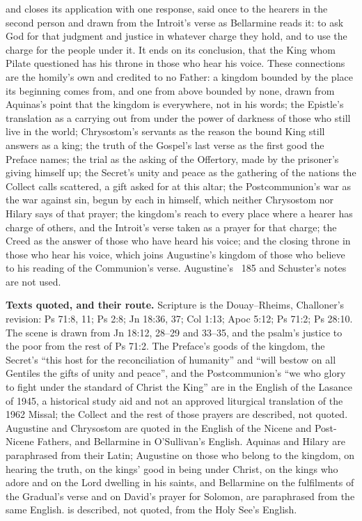 {and closes its application with one response, said once to the hearers in the
second person and drawn from the Introit's verse as Bellarmine reads it: to
ask God for that judgment and justice in whatever charge they hold, and to
use the charge for the people under it. It ends on its conclusion, that the
King whom Pilate questioned has his throne in those who hear his voice.
These connections are the homily's own and credited to no Father: a kingdom
bounded by the place its beginning comes from, and one from above bounded by
none, drawn from Aquinas's point that the kingdom is everywhere, not in his words; the
Epistle's translation as a carrying out from under the power of darkness of
those who still live in the world; Chrysostom's servants as the reason the
bound King still answers as a king; the truth of the Gospel's last verse as
the first good the Preface names; the trial as the asking of the Offertory,
made by the prisoner's giving himself up; the Secret's unity and peace as the
gathering of the nations the Collect calls scattered, a gift asked for at
this altar; the Postcommunion's war as the war against sin, begun by each in
himself, which neither Chrysostom nor Hilary says of that prayer; the
kingdom's reach to every place where a hearer has charge of others, and the
Introit's verse taken as a prayer for that charge; the Creed as the answer of
those who have heard his voice; and the closing throne in those who hear his
voice, which joins Augustine's kingdom of those who believe to his reading of
the Communion's verse. Augustine's ~185 and Schuster's notes are
not used.

\textbf{Texts quoted, and their route.} Scripture is the Douay--Rheims,
Challoner's revision: Ps 71:8, 11; Ps 2:8; Jn 18:36, 37; Col 1:13; Apoc 5:12;
Ps 71:2; Ps 28:10. The scene is drawn from Jn 18:12, 28--29 and 33--35, and
the psalm's justice to the poor from the rest of Ps 71:2. The Preface's goods
of the kingdom, the Secret's ``this host for the reconciliation of humanity''
and ``will bestow on all Gentiles the gifts of unity and peace'', and the
Postcommunion's ``we who glory to fight under the standard of Christ the
King'' are in the English of the Lasance  of 1945, a
historical study aid and not an approved liturgical translation of the 1962
Missal; the Collect and the rest of those prayers are described, not quoted.
Augustine and Chrysostom are quoted in the English of the Nicene and
Post-Nicene Fathers, and Bellarmine in O'Sullivan's English. Aquinas and
Hilary are paraphrased from their Latin; Augustine on those who belong to the
kingdom, on hearing the truth, on the kings' good in being under Christ, on
the kings who adore and on the Lord dwelling in his saints, and Bellarmine on
the fulfilments of the Gradual's verse and on David's prayer for Solomon, are paraphrased from
the same English.  is described, not quoted, from the Holy
See's English.

}
